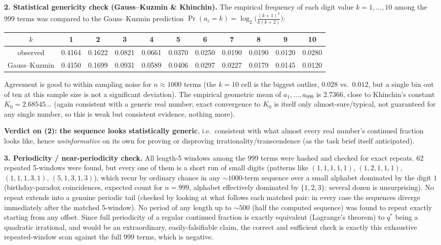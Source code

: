 \documentclass[11pt]{article}
\begin{document}
\textbf{2. Statistical genericity check (Gauss--Kuzmin \& Khinchin).} The empirical frequency of
each digit value $k=1,\ldots,10$ among the 999 terms was compared to the Gauss--Kuzmin prediction
$\Pr(a_i=k)=\log_2\!\big(\tfrac{(k+1)^2}{k(k+2)}\big)$:
\begin{center}
\begin{tabular}{c|cccccccccc}
$k$ & 1 & 2 & 3 & 4 & 5 & 6 & 7 & 8 & 9 & 10\\\hline
observed & 0.4164 & 0.1622 & 0.0821 & 0.0661 & 0.0370 & 0.0250 & 0.0190 & 0.0190 & 0.0120 & 0.0280\\
Gauss--Kuzmin & 0.4150 & 0.1699 & 0.0931 & 0.0589 & 0.0406 & 0.0297 & 0.0227 & 0.0179 & 0.0145 & 0.0120
\end{tabular}
\end{center}
Agreement is good to within sampling noise for $n\approx1000$ terms (the $k=10$ cell is the
biggest outlier, $0.028$ vs.\ $0.012$, but a single bin out of ten at this sample size is not a
significant deviation). The empirical geometric mean of $a_1,\ldots,a_{999}$ is $2.7366$, close
to Khinchin's constant $K_0=2.68545\ldots$ (again consistent with a generic real number; exact
convergence to $K_0$ is itself only almost-sure/typical, not guaranteed for any single number, so
this is weak but consistent evidence, nothing more).

\textbf{Verdict on (2): the sequence looks statistically generic}, i.e.\ consistent with what
almost every real number's continued fraction looks like, hence \emph{uninformative} on its own
for proving or disproving irrationality/transcendence (as the task brief itself anticipated).

\textbf{3. Periodicity / near-periodicity check.} All length-5 windows among the 999 terms were
hashed and checked for exact repeats. 62 repeated 5-windows were found, but every one of them is a
short run of small digits (patterns like $(1,1,1,1,1)$, $(1,2,1,1,1)$, $(1,1,1,3,1)$,
$(5,1,3,1,3)$), which recur by ordinary chance in any $\sim\!1000$-term sequence over a small
alphabet dominated by the digit $1$ (birthday-paradox coincidences, expected count for $n=999$,
alphabet effectively dominated by $\{1,2,3\}$: several dozen is unsurprising). No repeat extends
into a genuine periodic tail (checked by looking at what follows each matched pair: in every case
the sequences diverge immediately after the matched 5-window). No period of any length up to
$\sim500$ (half the computed sequence) was found to repeat exactly starting from any offset. Since
full periodicity of a regular continued fraction is exactly equivalent (Lagrange's theorem) to
$q^\ast$ being a quadratic irrational, and would be an extraordinary, easily-falsifiable claim, the
correct and sufficient check is exactly this exhaustive repeated-window scan against the full 999
terms, which is negative.
\end{document}

